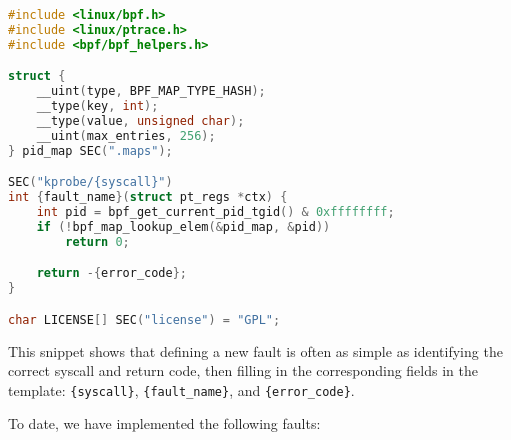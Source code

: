 \begin{lstlisting}[language=C,caption={Minimal eBPF template for injecting syscall-level faults},label={lst:fault_template}]
#include <linux/bpf.h>
#include <linux/ptrace.h>
#include <bpf/bpf_helpers.h>

struct {
    __uint(type, BPF_MAP_TYPE_HASH);
    __type(key, int);
    __type(value, unsigned char);
    __uint(max_entries, 256);
} pid_map SEC(".maps");

SEC("kprobe/{syscall}")
int {fault_name}(struct pt_regs *ctx) {
    int pid = bpf_get_current_pid_tgid() & 0xffffffff;
    if (!bpf_map_lookup_elem(&pid_map, &pid))
        return 0;

    return -{error_code};
}

char LICENSE[] SEC("license") = "GPL";
\end{lstlisting}

This snippet shows that defining a new fault is often as simple as identifying the correct syscall and return code, then filling in the corresponding fields in the template: \texttt{\{syscall\}}, \texttt{\{fault\_name\}}, and \texttt{\{error\_code\}}.


To date, we have implemented the following faults:

